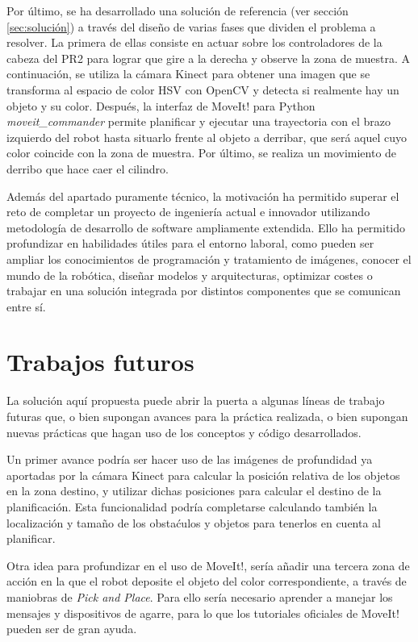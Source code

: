 \documentclass[12pt,spanish,chapterprefix, numbers=noenddot]{book}
\numberwithin{equation}{section}
\numberwithin{figure}{section}
\begin{document}
Por último, se ha desarrollado una solución de referencia (ver sección \ref{sec:solución}) a través del diseño de varias fases que dividen el problema a resolver. La primera de ellas consiste en actuar sobre los controladores de la cabeza del PR2 para lograr que gire a la derecha y observe la zona de muestra. A continuación, se utiliza la cámara Kinect para obtener una imagen que se transforma al espacio de color HSV con OpenCV y detecta si realmente hay un objeto y su color. Después, la interfaz de MoveIt! para Python \textit{moveit\_commander}  permite planificar y ejecutar una trayectoria con el brazo izquierdo del robot hasta situarlo frente al objeto a derribar, que será aquel cuyo color coincide con la zona de muestra. Por último, se realiza un movimiento de derribo que hace caer el cilindro.

Además del apartado puramente técnico, la motivación ha permitido superar el reto de completar un proyecto de ingeniería actual e innovador utilizando metodología de desarrollo de software ampliamente extendida. Ello ha permitido profundizar en habilidades útiles para el entorno laboral, como pueden ser ampliar los conocimientos de programación y tratamiento de imágenes, conocer el mundo de la robótica, diseñar modelos y arquitecturas, optimizar costes o trabajar en una solución integrada por distintos componentes que se comunican entre sí.  

\section{Trabajos futuros}

La solución aquí propuesta puede abrir la puerta a algunas líneas de trabajo futuras que, o bien supongan avances para la práctica realizada, o bien supongan nuevas prácticas que hagan uso de los conceptos y código desarrollados. 

Un primer avance podría ser hacer uso de las imágenes de profundidad ya aportadas por la cámara Kinect para calcular la posición relativa de los objetos en la zona destino, y utilizar dichas posiciones para calcular el destino de la planificación. Esta funcionalidad podría completarse calculando también la localización y tamaño de los obstaćulos y objetos para tenerlos en cuenta al planificar. 

Otra idea para profundizar en el uso de MoveIt!, sería añadir una tercera zona de acción en la que el robot deposite el objeto del color correspondiente, a través de maniobras de \textit{Pick and Place}. Para ello sería necesario aprender a manejar los mensajes y dispositivos de agarre, para lo que los tutoriales oficiales de MoveIt! pueden ser de gran ayuda.
\end{document}
